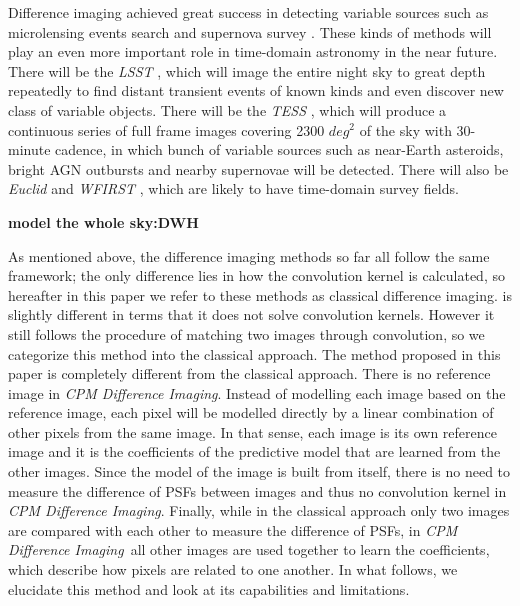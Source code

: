 \documentclass[12pt, preprint]{aastex}
\newcommand{\project}[1]{\textsl{#1}}
\newcommand{\cpmdiff}{\project{CPM Difference Imaging}}
\newcommand{\todo}[1]{\textbf{#1}}
\begin{document}
Difference imaging achieved great success in detecting variable sources such as microlensing events search \citep{macho, ogle} and supernova survey \citep{sdss}.
These kinds of methods will play an even more important role in time-domain astronomy in the near future. 
There will be the \project{LSST} \citep{lsst}, which will image the entire night sky to great depth repeatedly to find distant transient events of known kinds and even discover new class of variable objects. 
There will be the \project{TESS} \citep{tess}, which will produce a continuous series of full frame images covering 2300 $deg^2$ of the sky with 30-minute cadence, in which bunch of variable sources such as near-Earth asteroids,  bright AGN outbursts and nearby supernovae will be detected.
There will also be \project{Euclid} \citep{Euclid} and \project{WFIRST} \citep{wfirst}, which are likely to have time-domain survey fields.

\todo{model the whole sky:DWH}

As mentioned above, the difference imaging methods so far \citep{imagesub1, alard, varyingkernel, bramich} all follow the same framework; the only difference lies in how the convolution kernel is calculated, so hereafter in this paper we refer to these methods as classical difference imaging. 
\cite{optimal} is slightly different in terms that it does not solve convolution kernels.
However it still follows the procedure of matching two images through convolution, so we categorize this method into the classical approach.
The method proposed in this paper is completely different from the classical approach. 
There is no reference image in \cpmdiff. 
Instead of modelling each image based on the reference image, each pixel will be modelled directly by a linear combination of other pixels from the same image. 
In that sense, each image is its own reference image and it is the coefficients of the predictive model that are learned from the other images.
Since the model of the image is built from itself, there is no need to measure the difference of PSFs between images and thus no convolution kernel in \cpmdiff. 
Finally, while in the classical approach only two images are compared with each other to measure the difference of PSFs, in \cpmdiff\ all other images are used together to learn the coefficients, which describe how pixels are related to one another.
In what follows, we elucidate this method and look at its capabilities and limitations.
\end{document}
